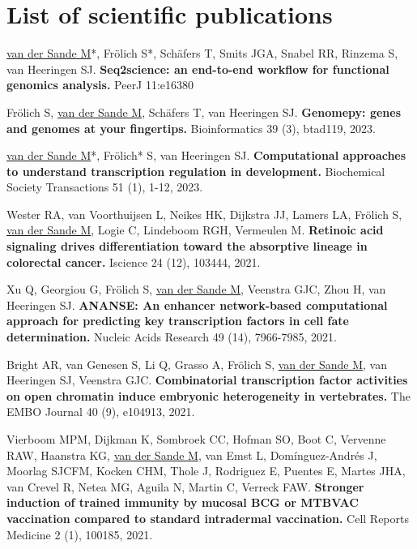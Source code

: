 \section{List of scientific publications}

\noindent
\underline{van der Sande M}*, Frölich S*, Schäfers T, Smits JGA, Snabel RR, Rinzema S, van Heeringen SJ. \textbf{Seq2science: an end-to-end workflow for functional genomics analysis.} PeerJ 11:e16380 \cite{seq2science}
\newline

\noindent
Frölich S, \underline{van der Sande M}, Schäfers T, van Heeringen SJ. \textbf{Genomepy: genes and genomes at your fingertips.} Bioinformatics 39 (3), btad119, 2023. \cite{Frlich2023}
\newline

\noindent
\underline{van der Sande M}*, Frölich* S, van Heeringen SJ. \textbf{Computational approaches to understand transcription regulation in development.} Biochemical Society Transactions 51 (1), 1-12, 2023. \cite{vanderSande2023}
\newline

\noindent
Wester RA, van Voorthuijsen L, Neikes HK, Dijkstra JJ, Lamers LA, Frölich S, \underline{van der Sande M}, Logie C, Lindeboom RGH, Vermeulen M. \textbf{Retinoic acid signaling drives differentiation toward the absorptive lineage in colorectal cancer.} Iscience 24 (12), 103444, 2021. \cite{Wester2021}
\newline

\noindent
Xu Q, Georgiou G, Frölich S, \underline{van der Sande M}, Veenstra GJC, Zhou H, van Heeringen SJ. \textbf{ANANSE: An enhancer network-based computational approach for predicting key transcription factors in cell fate determination.} Nucleic Acids Research 49 (14), 7966-7985, 2021. \cite{Xu_2020}
\newline

\noindent
Bright AR, van Genesen S, Li Q, Grasso A, Frölich S, \underline{van der Sande M}, van Heeringen SJ, Veenstra GJC.
\textbf{Combinatorial transcription factor activities on open chromatin induce embryonic heterogeneity in vertebrates.} The EMBO Journal 40 (9), e104913, 2021. \cite{Bright_2021}
\newline

\noindent
Vierboom MPM, Dijkman K, Sombroek CC, Hofman SO, Boot C, Vervenne RAW, Haanstra KG, \underline{van der Sande M}, van Emst L, Domínguez-Andrés J, Moorlag SJCFM, Kocken CHM, Thole J, Rodriguez E, Puentes E, Martes JHA, van Crevel R, Netea MG, Aguila N, Martin C, Verreck FAW. \textbf{Stronger induction of trained immunity by mucosal BCG or MTBVAC vaccination compared to standard intradermal vaccination.} Cell Reports Medicine 2 (1), 100185, 2021. \cite{Vierboom2021}
\newline

